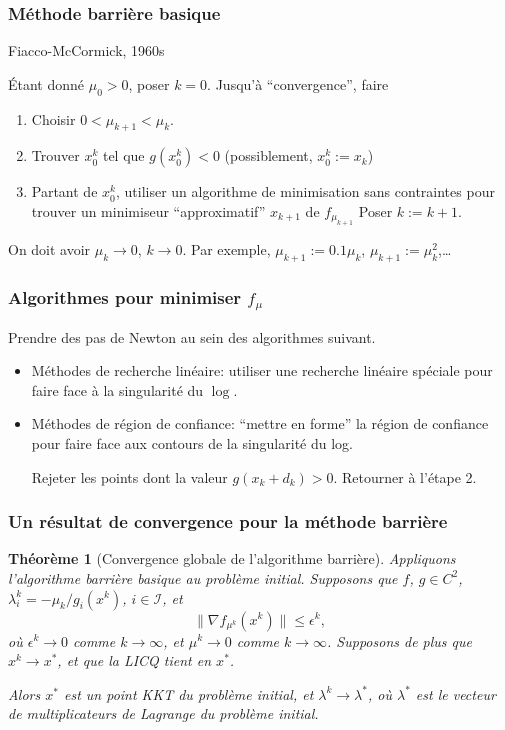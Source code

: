\documentclass[usepdftitle=false]{beamer}
\newtheorem{thm}{Théorème}
\def\cI{\mathcal{I}}
\begin{document}
\begin{frame}
\frametitle{Méthode barrière basique}

Fiacco-McCormick, 1960s

\mbox{}

Étant donné $\mu_0 > 0$, poser $k = 0$.
Jusqu'à ``convergence'', faire
\begin{enumerate}
\item
Choisir
$
0 < \mu_{k+1} < \mu_{k}.
$
\item
Trouver $x_0^k$ tel que $g(x_0^k) < 0$ (possiblement, $x_0^k := x_k$)
\item
Partant de $x_0^k$, utiliser un algorithme de minimisation sans contraintes pour trouver un minimiseur ``approximatif'' $x_{k+1}$ de $f_{\mu_{k+1}}$
Poser $k := k+1$.
\end{enumerate}

\mbox{}

On doit avoir $\mu_k \rightarrow 0$, $k \rightarrow 0$.
Par exemple, $\mu_{k+1} := 0.1\mu_k$, $\mu_{k+1} := \mu_k^2$,\ldots

\end{frame}

\begin{frame}
\frametitle{Algorithmes pour minimiser $f_{\mu}$}

Prendre des pas de Newton au sein des algorithmes suivant.
\begin{itemize}
\item
Méthodes de recherche linéaire:	utiliser une recherche linéaire spéciale pour faire face à la singularité du $\log$.
\item
Méthodes de région de confiance: ``mettre en forme'' la région de confiance pour faire face aux contours de la singularité du log.

\mbox{}

Rejeter les points dont la valeur $g(x_k+d_k) > 0$.
Retourner à l'étape 2.
\end{itemize}

\end{frame}

\begin{frame}
\frametitle{Un résultat de convergence pour la méthode barrière}

\begin{thm}[Convergence globale de l'algorithme barrière]
Appliquons l'algorithme barrière basique au problème initial.
Supposons que $f$, $g \in C^2$, $\lambda_i^k = -\mu_k/g_i(x^k)$, $i \in \cI$, et
$$
\| \nabla f_{\mu^k}(x^k) \| \leq \epsilon^k,
$$
où $\epsilon^k \rightarrow 0$ comme $k \rightarrow \infty$, et $\mu^k \rightarrow 0$ comme $k \rightarrow \infty$.
Supposons de plus que $x^k \rightarrow x^*$, et que la LICQ tient en $x^*$.

Alors $x^*$ est un point KKT du problème initial, et $\lambda^k \rightarrow \lambda^*$, où $\lambda^*$ est le vecteur de multiplicateurs de Lagrange du problème initial.
\end{thm}

\end{frame}
\end{document}
